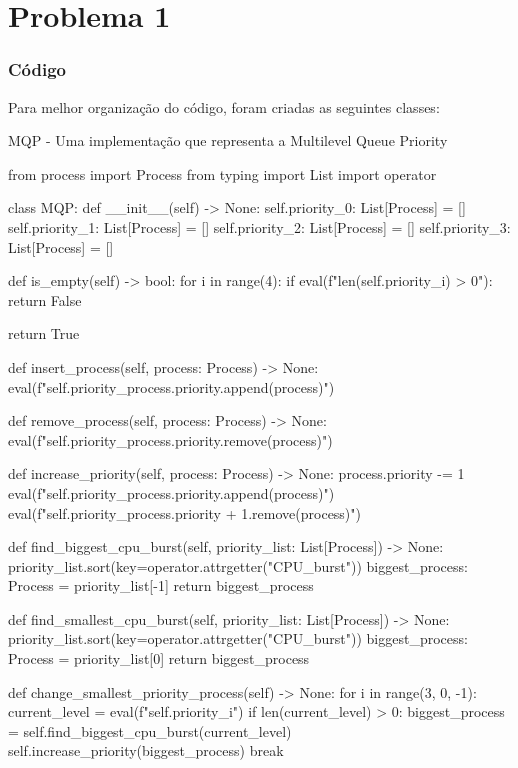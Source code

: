 \chapter{Problema 1}

\subsection*{Código}

Para melhor organização do código, foram criadas as seguintes classes:

MQP - Uma implementação que representa a Multilevel Queue Priority
\begin{pycode}
    from process import Process
    from typing import List
    import operator

    class MQP:
        def __init__(self) -> None:
            self.priority_0: List[Process] = []
            self.priority_1: List[Process] = []
            self.priority_2: List[Process] = []
            self.priority_3: List[Process] = []
            
        def is_empty(self) -> bool:
            for i in range(4):
                if eval(f"len(self.priority_{i}) > 0"):
                    return False
            
            return True

        
        def insert_process(self, process: Process) -> None:
            eval(f"self.priority_{process.priority}.append(process)")
        

        def remove_process(self, process: Process) -> None:
            eval(f"self.priority_{process.priority}.remove(process)")

        
        def increase_priority(self, process: Process) -> None:
            process.priority -= 1
            eval(f"self.priority_{process.priority}.append(process)")
            eval(f"self.priority_{process.priority + 1}.remove(process)")


        def find_biggest_cpu_burst(self, priority_list: List[Process]) -> None:
            priority_list.sort(key=operator.attrgetter("CPU_burst"))
            biggest_process: Process = priority_list[-1]
            return biggest_process
        
        def find_smallest_cpu_burst(self, priority_list: List[Process]) -> None:
            priority_list.sort(key=operator.attrgetter("CPU_burst"))
            biggest_process: Process = priority_list[0]
            return biggest_process


        def change_smallest_priority_process(self) -> None:
            for i in range(3, 0, -1):
                current_level = eval(f"self.priority_{i}")
                if len(current_level) > 0:
                    biggest_process = self.find_biggest_cpu_burst(current_level)
                    self.increase_priority(biggest_process)
                    break


\end{pycode}
